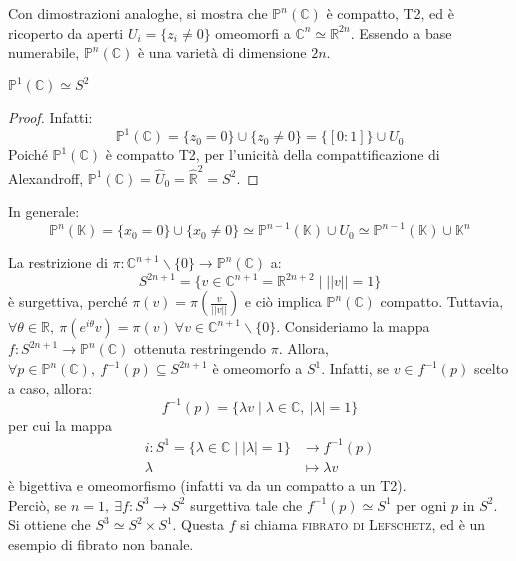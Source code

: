 Con dimostrazioni analoghe, si mostra che $\mathbb{P}^n(\mathbb{C})$ è compatto, T2, ed è ricoperto da aperti $U_i=\{z_i \neq 0\}$ omeomorfi a $\mathbb{C}^n \simeq \mathbb{R}^{2n}$. Essendo a base numerabile, $\mathbb{P}^n(\mathbb{C})$ è una varietà di dimensione $2n$.

\begin{prop}
$\mathbb{P}^1(\mathbb{C}) \simeq S^2$
\end{prop}
\begin{proof}
Infatti:
$$\mathbb{P}^1(\mathbb{C})=\{z_0=0\} \cup \{z_0 \neq 0\}=\{[0:1]\} \cup U_0$$
Poiché $\mathbb{P}^1(\mathbb{C})$ è compatto T2, per l'unicità della compattificazione di Alexandroff, $\mathbb{P}^1(\mathbb{C})=\hat{U}_0=\hat{\mathbb{R}}^2=S^2$.
\end{proof}

In generale:
$$\mathbb{P}^n(\mathbb{K})=\{x_0=0\} \cup \{x_0 \neq 0\} \simeq \mathbb{P}^{n-1}(\mathbb{K}) \cup U_0 \simeq \mathbb{P}^{n-1}(\mathbb{K}) \cup \mathbb{K}^n$$

\begin{ex}
La restrizione di $\pi :\mathbb{C}^{n+1} \smallsetminus \{0\} \rightarrow \mathbb{P}^n(\mathbb{C})$ a:
$$S^{2n+1}=\{v \in \mathbb{C}^{n+1}=\mathbb{R}^{2n+2} \mid ||v||=1\}$$
è surgettiva, perché $\pi(v)=\pi(\frac{v}{||v||})$ e ciò implica $\mathbb{P}^n(\mathbb{C})$ compatto. Tuttavia, $\forall \theta \in \mathbb{R},\ \pi(e^{i\theta}v)=\pi(v) \ \forall v \in \mathbb{C}^{n+1} \smallsetminus \{0\}$. Consideriamo la mappa $f: S^{2n+1} \rightarrow \mathbb{P}^n(\mathbb{C})$ ottenuta restringendo $\pi$. Allora, $\forall p \in \mathbb{P}^n(\mathbb{C}),\ f^{-1}(p) \subseteq S^{2n+1}$ è omeomorfo a $S^1$. Infatti, se $v \in f^{-1}(p)$ scelto a caso, allora:
$$f^{-1}(p)=\{\lambda v \mid \lambda \in \mathbb{C},\ |\lambda|=1\}$$
per cui la mappa
\begin{align*}
i:S^1=\{\lambda \in \mathbb{C} \mid |\lambda|=1\} &\longrightarrow f^{-1}(p) \\
\lambda &\longmapsto \lambda v
\end{align*}
è bigettiva e omeomorfismo (infatti va da un compatto a un T2).\\
Perciò, se $n=1,\ \exists f:S^3 \rightarrow S^2$ surgettiva tale che $f^{-1}(p) \simeq S^1$ per ogni $p$ in $S^2$. Si ottiene che $S^3 \simeq S^2 \times S^1$. Questa $f$ si chiama \textsc{fibrato di Lefschetz}, ed è un esempio di fibrato non banale.
\end{ex}

